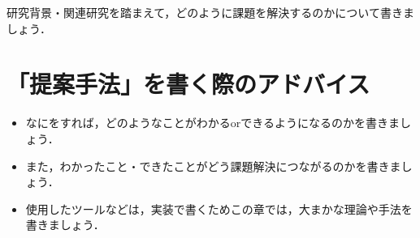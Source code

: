 研究背景・関連研究を踏まえて，どのように課題を解決するのかについて書きましょう．

\section{「提案手法」を書く際のアドバイス}
\begin{itemize}
    \item なにをすれば，どのようなことがわかるorできるようになるのかを書きましょう．
    \item また，わかったこと・できたことがどう課題解決につながるのかを書きましょう．
    \item 使用したツールなどは，実装で書くためこの章では，大まかな理論や手法を書きましょう．
\end{itemize}